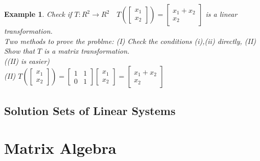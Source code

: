 \documentclass[a4paper,12pt,openany]{book}
\theoremstyle{defn}
\theoremstyle{expl}
\newtheorem{expl}{Example}[section]
\begin{document}
\begin{expl}
\textup{
Check if $T:R^2\rightarrow R^2\quad T\left(\left[\begin{array}{c}x_1\\x_2\end{array}\right]\right)=\left[\begin{array}{c}x_1+x_2\\x_2\end{array}\right]$ is a linear transformation.\\
Two methods to prove the problme: (I) Check the conditions (i),(ii) directly, (II) Show that $T$ is a matrix transformation.\\((II) is easier)\\
(II) $T\left(\left[\begin{array}{c}x_1\\x_2\end{array}\right]\right)=\left[\begin{array}{cc}1&1\\0&1\end{array}\right]\left[\begin{array}{c}x_1\\x_2\end{array}\right]=\left[\begin{array}{c}x_1+x_2\\x_2\end{array}\right]$\\
}\end{expl}
\section{Solution Sets of Linear Systems}
\chapter{Matrix Algebra}
\end{document}
